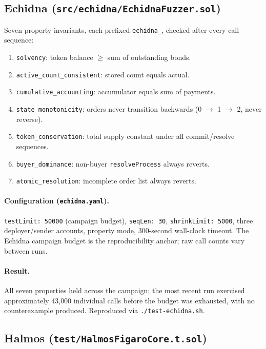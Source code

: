 \documentclass[11pt,a4paper]{article}
\theoremstyle{definition}
\theoremstyle{remark}
\begin{document}
\subsection{Echidna (\texttt{src/echidna/EchidnaFuzzer.sol})}

Seven property invariants, each prefixed \texttt{echidna\_}, checked
after every call sequence:
\begin{enumerate}[label=\textbf{E\arabic*}]
  \item \texttt{solvency}: token balance $\geq$ sum of outstanding
    bonds.
  \item \texttt{active\_count\_consistent}: stored count equals
    actual.
  \item \texttt{cumulative\_accounting}: accumulator equals sum of
    payments.
  \item \texttt{state\_monotonicity}: orders never transition
    backwards (0 $\to$ 1 $\to$ 2, never reverse).
  \item \texttt{token\_conservation}: total supply constant under
    all commit/resolve sequences.
  \item \texttt{buyer\_dominance}: non-buyer \texttt{resolveProcess}
    always reverts.
  \item \texttt{atomic\_resolution}: incomplete order list always
    reverts.
\end{enumerate}

\paragraph{Configuration (\texttt{echidna.yaml}).}
\texttt{testLimit: 50000} (campaign budget), \texttt{seqLen: 30},
\texttt{shrinkLimit: 5000}, three deployer/sender accounts, property
mode, 300-second wall-clock timeout. The Echidna campaign budget is
the reproducibility anchor; raw call counts vary between runs.

\paragraph{Result.}
All seven properties held across the campaign; the most recent run
exercised approximately 43{,}000 individual calls before the budget
was exhausted, with no counterexample produced. Reproduced via
\texttt{./test-echidna.sh}.

\subsection{Halmos (\texttt{test/HalmosFigaroCore.t.sol})}
\end{document}
